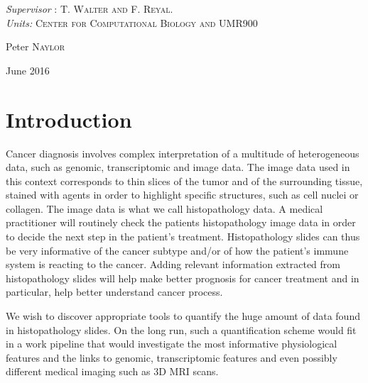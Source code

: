 \documentclass[a4paper,10pt]{article}
\begin{document}
\begin{titlepage}
   \begin{center}  \large
\textit{Supervisor} : \textsc{T. Walter and F. Reyal}. \\
\textit{Units:} \textsc{Center for Computational Biology and UMR900}

   \end{center}
     
  \begin{center} \Large
  Peter \textsc{Naylor}
  \end{center}


  \begin{center}  \large
    June 2016
  \end{center}

\end{titlepage}




\newpage
\tableofcontents
\newpage

\section{Introduction}

 Cancer diagnosis involves complex interpretation of a multitude of heterogeneous data, such as genomic, transcriptomic and image data. The image data used in this context corresponds to thin slices of the tumor and of the surrounding tissue, stained with agents in order to highlight specific structures, such as cell nuclei or collagen. The image data is what we call histopathology data.
A medical practitioner will routinely check the patients histopathology image data in order to decide the next step in the patient's treatment. Histopathology slides can thus be very informative of the cancer subtype and/or of how the patient's immune system is reacting to the cancer. Adding relevant information extracted from histopathology slides will help make better prognosis for cancer treatment and in particular, help better understand cancer process. 

 We wish to discover appropriate tools to quantify the huge amount of data found in histopathology slides. On the long run, such a quantification scheme would fit in a work pipeline that would investigate the most informative physiological features and the links to genomic, transcriptomic features and even possibly different medical imaging such as 3D MRI scans.
 
\end{document}
